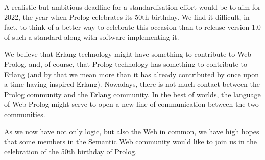 \documentclass{tlp}
\begin{document}
A realistic but ambitious deadline for a standardisation effort would be to aim for 2022, the year when Prolog celebrates its 50th birthday. We find it difficult, in fact, to think of a better way to celebrate this occasion than to release version 1.0 of such a standard along with software implementing it.

 

We believe that Erlang technology might have something to contribute to Web Prolog, and, of course, that Prolog technology has something to contribute to Erlang (and by that we mean more than it has already contributed by once upon a time having inspired Erlang). 
Nowadays, there is not much contact between the Prolog community and the Erlang community. In the best of worlds, the language of Web Prolog might serve to open a new line of communication between the two communities.

As we now have not only logic, but also the Web in common, we have high hopes that some members in the Semantic Web community would like to join us in the celebration of the 50th birthday of Prolog.


\end{document}
